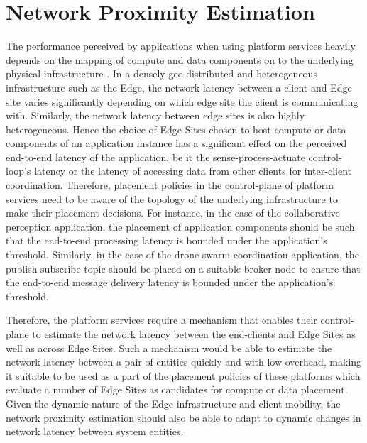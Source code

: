 \section{Network Proximity Estimation}
The performance perceived by applications when using platform services heavily depends on the mapping of compute and data components on to the underlying physical infrastructure \cite{sarkar2016theoretical,amarasinghe2018data,naas2017ifogstor,liu2019mobility}. In a densely geo-distributed and heterogeneous infrastructure such as the Edge, the network latency between a client and Edge site varies significantly depending on which edge site the client is communicating with. Similarly, the network latency between edge sites is also highly heterogeneous.
Hence the choice of Edge Sites chosen to host compute or data components of an application instance has a significant effect on the perceived end-to-end latency of the application, be it the sense-process-actuate control-loop's latency or the latency of accessing data from other clients for inter-client coordination. Therefore, placement policies in the control-plane of platform services need to be aware of the topology of the underlying infrastructure to make their placement decisions. For instance, in the case of the collaborative perception application, the placement of application components should be such that the end-to-end processing latency is bounded under the application's  threshold. Similarly, in the case of the drone swarm coordination application, the publish-subscribe topic should be placed on a suitable broker node to ensure that the end-to-end message delivery latency is bounded under the application's threshold.  
\par Therefore, the platform services require a mechanism that enables their control-plane to estimate the network latency between the end-clients and Edge Sites as well as across Edge Sites. Such a mechanism would be able to estimate the network latency between a pair of entities quickly and with low overhead, making it suitable to be used as a part of the placement policies of these platforms which evaluate a number of Edge Sites as candidates for compute or data placement. Given the dynamic nature of the Edge infrastructure and client mobility, the network proximity estimation should also be able to adapt to dynamic changes in network latency between system entities.

